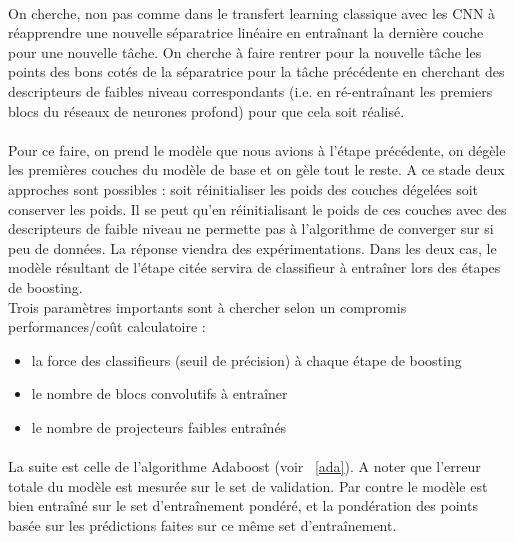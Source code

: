 \documentclass[11 pt]{article}
\begin{document}
\paragraph{}On cherche, non pas comme dans le transfert learning classique avec les CNN à réapprendre une nouvelle séparatrice linéaire en entraînant la dernière couche pour une nouvelle tâche. On cherche à faire rentrer pour la nouvelle tâche les points des bons cotés de la séparatrice pour la tâche précédente en cherchant des descripteurs de faibles niveau correspondants (i.e. en ré-entraînant les premiers blocs du réseaux de neurones profond) pour que cela soit réalisé.

\paragraph{}Pour ce faire,  on prend le modèle que nous avions à l’étape précédente, on dégèle les premières couches du modèle de base et on gèle tout le reste. A ce stade deux approches sont possibles : soit réinitialiser les poids des couches dégelées soit conserver les poids. Il se peut qu’en réinitialisant le poids de ces couches avec des descripteurs de faible niveau ne permette pas à l’algorithme de converger sur si peu de données. La réponse viendra des expérimentations. Dans les deux cas, le modèle résultant de l’étape citée servira de classifieur à entraîner lors des étapes de boosting.\\

Trois paramètres importants sont à chercher selon un compromis performances/coût calculatoire :\\ \medskip
\begin{itemize}
  \item la force des classifieurs (seuil de précision) à chaque étape de boosting
  \item le nombre de blocs convolutifs à entraîner
  \item le nombre de projecteurs faibles entraînés
\end{itemize}

\paragraph{}La suite est celle de l’algorithme Adaboost (voir ~\ref{ada}). A noter que l’erreur totale du modèle est mesurée sur le set de validation. Par contre le modèle est bien entraîné sur le set d’entraînement pondéré, et la pondération des points basée sur les prédictions faites sur ce même set d’entraînement.\\
\end{document}
